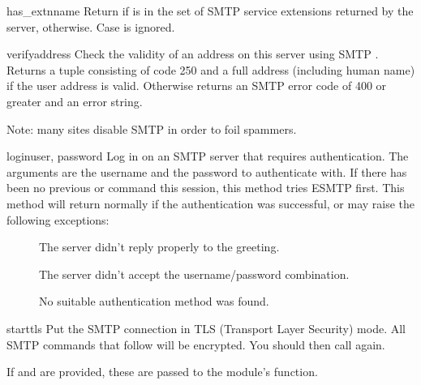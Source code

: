 \begin{methoddesc}{has_extn}{name}
Return  if  is in the set of SMTP service extensions
returned by the server,  otherwise.  Case is ignored.
\end{methoddesc}

\begin{methoddesc}{verify}{address}
Check the validity of an address on this server using SMTP .
Returns a tuple consisting of code 250 and a full  address
(including human name) if the user address is valid. Otherwise returns
an SMTP error code of 400 or greater and an error string.

Note: many sites disable SMTP  in order to foil spammers.
\end{methoddesc}

\begin{methoddesc}{login}{user, password}
Log in on an SMTP server that requires authentication.
The arguments are the username and the password to authenticate with.
If there has been no previous  or  command this
session, this method tries ESMTP  first.
This method will return normally if the authentication was successful,
or may raise the following exceptions:

\begin{description}
  \item[]
    The server didn't reply properly to the  greeting.
  \item[]
    The server didn't accept the username/password combination.
  \item[]
    No suitable authentication method was found.
\end{description}
\end{methoddesc}

\begin{methoddesc}{starttls}{}
Put the SMTP connection in TLS (Transport Layer Security) mode.  All
SMTP commands that follow will be encrypted.  You should then call
 again.

If  and  are provided, these are passed to
the  module's  function.
\end{methoddesc}

